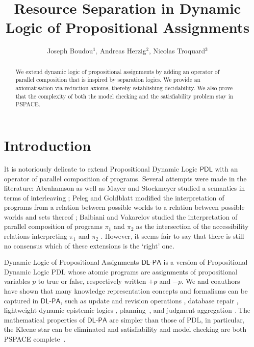 \documentclass{llncs}
\title{Resource Separation in Dynamic Logic of Propositional Assignments }
\author{Joseph Boudou$^1$, Andreas Herzig$^2$, Nicolas Troquard$^3$}
\institute{
  IRIT, University of Toulouse, France \and
  IRIT, CNRS, France \and
  Free University of Bozen-Bolzano, Italy 
}
\newcommand{\Dlpa}{\ensuremath{\mathsf{DL\text{-}PA}}\xspace}
\newcommand{\Pdl}{\ensuremath{\mathsf{PDL}}\xspace}
\newcommand{\assgntop}[1]{{\mathtt {+} #1}}
\newcommand{\assgnbot}[1]{{\mathtt {-} #1}}
\begin{document}
\maketitle

\begin{abstract}
We extend dynamic logic of propositional assignments by adding an operator of parallel composition that is inspired by separation logics. 
We provide an axiomatisation via reduction axioms, thereby establishing decidability. 
We also prove that the complexity of both the model checking and the satisfiability problem stay in PSPACE.
\end{abstract}


\section{Introduction}

It is notoriously delicate to extend Propositional Dynamic Logic \Pdl with an operator of parallel composition of programs. 
Several attempts were made in the literature:
Abrahamson as well as Mayer and Stockmeyer studied a semantics in terms of interleaving \cite{Abrahamson80,MayerS96}; 
Peleg and Goldblatt modified the interpretation of programs from a relation between possible worlds to a relation between
possible worlds and sets thereof \cite{Peleg87,Goldblatt92}; 
Balbiani and Vakarelov studied the interpretation of parallel composition of programs $\pi_1$ and $\pi_2$ as 
the intersection of the accessibility relations interpreting $\pi_1$ and $\pi_2$ \cite{BalbianiV03}. 
However, it seems fair to say that there is still no consensus which of these extensions is the `right' one. 

Dynamic Logic of Propositional Assignments \Dlpa \cite{BalbianiHerzigTroquard-Lics13,BalbianiHST14} 
is a version of Propositional Dynamic Logic PDL whose atomic programs are 
assignments of propositional variables $p$ to true or false, respectively written $\assgntop p$ and $\assgnbot p$. 
We and coauthors have shown that many knowledge representation concepts and formalisms can be captured in \Dlpa, such as 
update and revision operations \cite{Herzig-Kr14}, 
database %
repair 
\cite{%
FeuilladeHR19}, 
lightweight dynamic epistemic logics \cite{DBLP:conf/atal/CharrierS15,CooperHMMR16,DBLP:conf/atal/CharrierS17},
planning~\cite{HerzigEtal-Ecai14}, and
judgment aggregation \cite{DBLP:journals/logcom/NovaroGH18}. 
The mathematical properties of \Dlpa are simpler than those of PDL, in particular, 
the Kleene star can be eliminated \cite{BalbianiHerzigTroquard-Lics13} and 
satisfiability and model checking are both PSPACE complete~\cite{BalbianiHST14}. 
\end{document}
